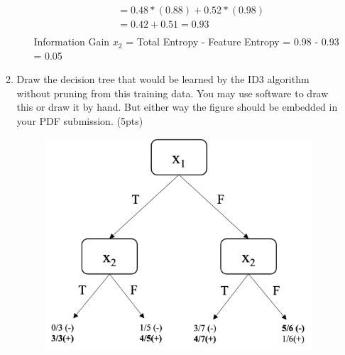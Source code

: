 \documentclass[12pt]{article}
\begin{document}
\begin{enumerate}
\begin{enumerate}
\begin{enumerate}
\begin{equation*}
\begin{split}
	            &= 0.48 * (0.88) + 0.52 * (0.98) \\
	            &= 0.42 + 0.51 = 0.93 \\
	        \end{split}
	    \end{equation*}
	        Information Gain $x_2$ = Total Entropy - Feature Entropy = 0.98 - 0.93 = 0.05
	\end{enumerate}
	\item Draw the decision tree that would be learned by the ID3 algorithm without pruning from this training data. You may use software to draw this or draw it by hand.  But either way the figure should be embedded in your PDF submission. (5pts) \\
	\begin{figure}[H]
        \begin{center}
        \includegraphics{images/Decision_Tree.png}
        \label{GD}
        \end{center}
    \end{figure}

\end{enumerate}
	

\end{enumerate}
\end{document}

